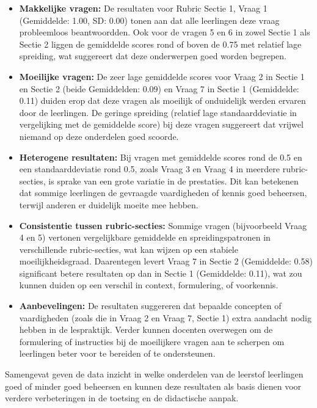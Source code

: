 \documentclass[12pt]{article}
\begin{document}
\noindent\begin{itemize}
    \item \textbf{Makkelijke vragen:} De resultaten voor Rubric Sectie 1, Vraag 1 (Gemiddelde: 1.00, SD: 0.00) tonen aan dat alle leerlingen deze vraag probleemloos beantwoordden. Ook voor de vragen 5 en 6 in zowel Sectie 1 als Sectie 2 liggen de gemiddelde scores rond of boven de 0.75 met relatief lage spreiding, wat suggereert dat deze onderwerpen goed worden begrepen.
    
    \item \textbf{Moeilijke vragen:} De zeer lage gemiddelde scores voor Vraag 2 in Sectie 1 en Sectie 2 (beide Gemiddelden: 0.09) en Vraag 7 in Sectie 1 (Gemiddelde: 0.11) duiden erop dat deze vragen als moeilijk of onduidelijk werden ervaren door de leerlingen. De geringe spreiding (relatief lage standaarddeviatie in vergelijking met de gemiddelde score) bij deze vragen suggereert dat vrijwel niemand op deze onderdelen goed scoorde.
    
    \item \textbf{Heterogene resultaten:} Bij vragen met gemiddelde scores rond de 0.5 en een standaarddeviatie rond 0.5, zoals Vraag 3 en Vraag 4 in meerdere rubric-secties, is sprake van een grote variatie in de prestaties. Dit kan betekenen dat sommige leerlingen de gevraagde vaardigheden of kennis goed beheersen, terwijl anderen er duidelijk moeite mee hebben.
    
    \item \textbf{Consistentie tussen rubric-secties:} Sommige vragen (bijvoorbeeld Vraag 4 en 5) vertonen vergelijkbare gemiddelde en spreidingspatronen in verschillende rubric-secties, wat kan wijzen op een stabiele moeilijkheidsgraad. Daarentegen levert Vraag 7 in Sectie 2 (Gemiddelde: 0.58) significant betere resultaten op dan in Sectie 1 (Gemiddelde: 0.11), wat zou kunnen duiden op een verschil in context, formulering, of voorkennis.
    
    \item \textbf{Aanbevelingen:}  
    De resultaten suggereren dat bepaalde concepten of vaardigheden (zoals die in Vraag 2 en Vraag 7, Sectie 1) extra aandacht nodig hebben in de lespraktijk. Verder kunnen docenten overwegen om de formulering of instructies bij de moeilijkere vragen aan te scherpen om leerlingen beter voor te bereiden of te ondersteunen.
\end{itemize}

Samengevat geven de data inzicht in welke onderdelen van de leerstof leerlingen goed of minder goed beheersen en kunnen deze resultaten als basis dienen voor verdere verbeteringen in de toetsing en de didactische aanpak.
\end{document}
